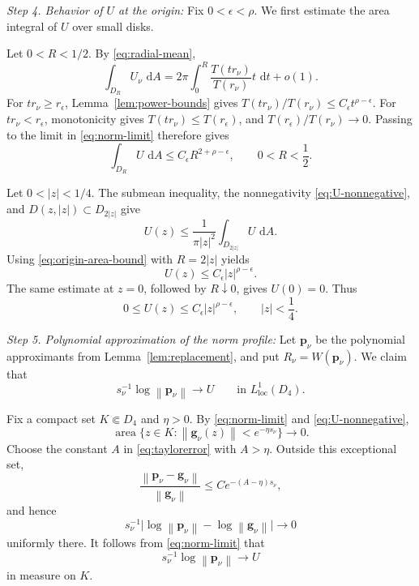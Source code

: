 \documentclass[12pt,letterpaper,reqno]{amsart}
\theoremstyle{definition}
\numberwithin{equation}{section}
\newcommand{\dd}{\,\mathrm d}
\newcommand{\dA}{\,\mathrm dA}
\newcommand{\loc}{\mathrm{loc}}
\newcommand{\norm}[1]{\left\lVert#1\right\rVert}
\DeclareMathOperator{\meas}{area}
\newcommand{\gv}{\bm g}
\newcommand{\pv}{\bm p}
\begin{document}
\medskip\noindent
\emph{{Step 4. Behavior of \(U\) at the origin:}}
Fix \(0<\epsilon<\rho\). We first estimate the area integral of \(U\)
over small disks.

Let \(0<R<1/2\). By \eqref{eq:radial-mean},
\[
\int_{D_R}U_\nu\,\dA
=
2\pi
\int_0^R
\frac{T(tr_\nu)}{T(r_\nu)}t\,\dd t
+
o(1).
\]
For \(tr_\nu\geq r_\epsilon\),
Lemma~\ref{lem:power-bounds} gives
\(T(tr_\nu)/T(r_\nu)\leq
C_\epsilon t^{\rho-\epsilon}\).
For \(tr_\nu<r_\epsilon\), monotonicity gives
\(T(tr_\nu)\leq T(r_\epsilon)\), and
\(T(r_\epsilon)/T(r_\nu)\to0\).
Passing to the limit in \eqref{eq:norm-limit} therefore gives
\begin{equation}\label{eq:origin-area-bound}
 \int_{D_R}U\,\dA
 \leq
 C_\epsilon R^{2+\rho-\epsilon},
 \qquad
 0<R<\frac12.
\end{equation}

Let \(0<|z|<1/4\). The submean inequality, the nonnegativity
\eqref{eq:U-nonnegative}, and
\(D(z,|z|)\subset D_{2|z|}\) give
\[
U(z)
\leq
\frac1{\pi|z|^2}
\int_{D_{2|z|}}U\,\dA.
\]
Using \eqref{eq:origin-area-bound} with \(R=2|z|\) yields
\[
U(z)\leq C_\epsilon|z|^{\rho-\epsilon}.
\]
The same estimate at \(z=0\), followed by \(R\downarrow0\), gives
\(U(0)=0\). Thus
\begin{equation}\label{eq:origin-bound}
 0\leq
 U(z)
 \leq
 C_\epsilon|z|^{\rho-\epsilon},
 \qquad
 |z|<\frac14.
\end{equation}


\medskip\noindent
\emph{{Step 5. Polynomial approximation of the norm profile:}}
Let \(\pv_\nu\) be the polynomial approximants from
Lemma~\ref{lem:replacement}, and put
\(R_\nu=W(\pv_\nu)\).
We claim that
\begin{equation}\label{eq:polynomial-norm}
 s_\nu^{-1}\log\norm{\pv_\nu}
 \longrightarrow U
 \qquad\text{in }L^1_{\loc}(D_4).
\end{equation}

Fix a compact set \(K\Subset D_4\) and \(\eta>0\). By
\eqref{eq:norm-limit} and \eqref{eq:U-nonnegative},
\[
\meas\{
z\in K:\norm{\gv_\nu(z)}<e^{-\eta s_\nu}
\}
\longrightarrow0.
\]
Choose the constant \(A\) in \eqref{eq:taylorerror} with \(A>\eta\).
Outside this exceptional set,
\[
\frac{\norm{\pv_\nu-\gv_\nu}}
     {\norm{\gv_\nu}}
\leq
C e^{-(A-\eta)s_\nu},
\]
and hence
\[
s_\nu^{-1}
 \bigl|\log\norm{\pv_\nu}-\log\norm{\gv_\nu}\bigr|\longrightarrow0
\]
uniformly there. It follows from \eqref{eq:norm-limit} that
\[
s_\nu^{-1}\log\norm{\pv_\nu}\longrightarrow U
\]
in measure on \(K\).
\end{document}
